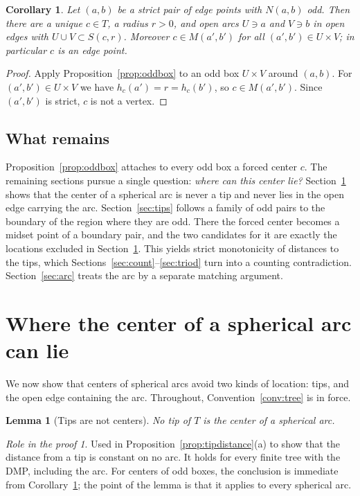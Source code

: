 \documentclass[11pt]{amsart}
\newtheorem{lemma}[theorem]{Lemma}
\newtheorem{corollary}[theorem]{Corollary}
\theoremstyle{definition}
\theoremstyle{remark}
\newtheorem*{role}{Role in the proof}
\newcommand{\M}{M}
\newcommand{\N}{N}
\begin{document}
\begin{corollary}\label{cor:oddpair}
Let $(a,b)$ be a strict pair of edge points with $\N(a,b)$ odd. Then there are a unique $c\in T$, a radius $r>0$, and open arcs $U\ni a$ and $V\ni b$ in open edges with $U\cup V\subset S(c,r)$. Moreover $c\in\M(a',b')$ for all $(a',b')\in U\times V$; in particular $c$ is an edge point.
\end{corollary}
\begin{proof}
Apply Proposition~\ref{prop:oddbox} to an odd box $U\times V$ around $(a,b)$. For $(a',b')\in U\times V$ we have $h_c(a')=r=h_c(b')$, so $c\in\M(a',b')$. Since $(a',b')$ is strict, $c$ is not a vertex.
\end{proof}

\subsection*{What remains}
Proposition~\ref{prop:oddbox} attaches to every odd box a forced center $c$. The remaining sections pursue a single question: \emph{where can this center lie?} Section~\ref{sec:centers} shows that the center of a spherical arc is never a tip and never lies in the open edge carrying the arc. Section~\ref{sec:tips} follows a family of odd pairs to the boundary of the region where they are odd. There the forced center becomes a midset point of a boundary pair, and the two candidates for it are exactly the locations excluded in Section~\ref{sec:centers}. This yields strict monotonicity of distances to the tips, which Sections~\ref{sec:count}--\ref{sec:triod} turn into a counting contradiction. Section~\ref{sec:arc} treats the arc by a separate matching argument.

\section{Where the center of a spherical arc can lie}\label{sec:centers}

We now show that centers of spherical arcs avoid two kinds of location: tips, and the open edge containing the arc. Throughout, Convention~\ref{conv:tree} is in force.

\begin{lemma}[Tips are not centers]\label{lem:tips}
No tip of $T$ is the center of a spherical arc.
\end{lemma}

\begin{role}
Used in Proposition~\ref{prop:tipdistance}(a) to show that the distance from a tip is constant on no arc. It holds for every finite tree with the DMP, including the arc. For centers of odd boxes, the conclusion is immediate from Corollary~\ref{cor:oddpair}; the point of the lemma is that it applies to every spherical arc.
\end{role}
\end{document}
